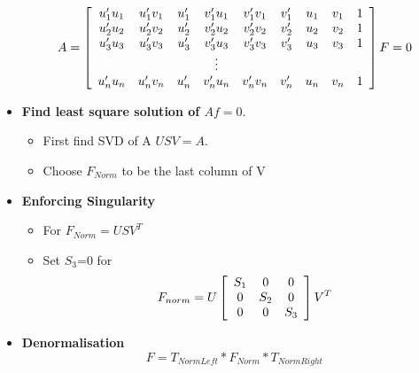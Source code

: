 \documentclass[a4paper,12pt]{article}
\begin{document}
\begin{itemize}
\begin{equation}
            A = \left[ 
            \begin{array}[ ]{ccccccccc}
                u'_1u_1 & u'_1v_1 & u'_1 & v'_1u_1 &v'_1v_1 & v'_1 & u_1 & v_1 & 1 \\
                u'_2u_2 & u'_2v_2 & u'_2 & v'_2u_2 &v'_2v_2 & v'_2 & u_2 & v_2 & 1 \\
                u'_3u_3 & u'_3v_3 & u'_3 & v'_3u_3 &v'_3v_3 & v'_3 & u_3 & v_3 & 1 \\
                &&& \vdots \\
                u'_nu_n & u'_nv_n & u'_n & v'_nu_n &v'_nv_n & v'_n & u_n & v_n & 1 
            \end{array}
            \right] F = 0
        \end{equation}
    \item \textbf{Find least square solution of $Af = 0$}. 
        \begin{itemize}
            \item First find SVD of A $USV = A$. 
            \item Choose $F_{Norm}$ to be the last column of V
        \end{itemize}
    \item \textbf{Enforcing Singularity} 
        \begin{itemize}
            \item For $F_{Norm}=USV^T$ 
            \item Set $S_3$=0 for 
            \begin{equation}
                       F_{norm} =U \left[ 
            \begin{array}[]{ccc}
                        S_1 & 0 & 0 \\
                        0 & S_2  & 0 \\
                        0 & 0 & S_3 
                    \end{array}
            \right] V^T
            \end{equation}
        \end{itemize}
    \item \textbf{Denormalisation}
    	\begin{equation}
    	F=T_{NormLeft}*F_{Norm}*T_{NormRight}
    	\end{equation}
    \end{itemize}
        
\end{document}
